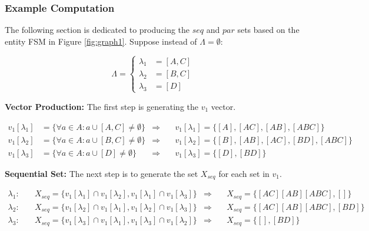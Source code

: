 \subsubsection{Example Computation}
The following section is dedicated to producing the $seq$ and $par$ sets based on the entity FSM in Figure \ref{fig:graph1}. Suppose instead of $\Lambda = \emptyset$:

\begin{equation*}
\Lambda = \begin{cases}
    \lambda_1 &= [A,C] \\
    \lambda_2 &= [B,C] \\ 
    \lambda_3 &= [D]    
\end{cases}
\end{equation*}


\textbf{Vector Production:} The first step is generating the $v_1$ vector.

\begin{align*}
    v_1[\lambda_1] &= \{ \forall a \in A : a \cup [A,C] \neq \emptyset \} & \Rightarrow &
    \quad v_1[\lambda_1] = \{[A],[AC],[AB],[ABC]\} \\
    v_1[\lambda_2] &= \{ \forall a \in A : a \cup [B,C] \neq \emptyset \} & \Rightarrow &
    \quad v_1[\lambda_2] = \{[B],[AB],[AC],[BD],[ABC]\} \\
    v_1[\lambda_3] &= \{ \forall a \in A : a \cup [D] \neq \emptyset \} & \Rightarrow &
    \quad v_1[\lambda_3] = \{[D],[BD]\}
\end{align*}

\textbf{Sequential Set:} The next step is to generate the set $X_{seq}$ for each set in $v_1$.

\begin{align*}
    \lambda_1: \quad & X_{seq} = \{v_1[\lambda_1] \cap v_1[\lambda_2], v_1[\lambda_1] \cap v_1[\lambda_3]\} & \Rightarrow & \quad X_{seq} = \{[AC][AB][ABC],[]\} \\ 
    \lambda_2: \quad & X_{seq} = \{v_1[\lambda_2] \cap v_1[\lambda_1], v_1[\lambda_2] \cap v_1[\lambda_3]\} & \Rightarrow & \quad X_{seq} = \{[AC][AB][ABC],[BD]\} \\ 
    \lambda_3: \quad & X_{seq} = \{v_1[\lambda_3] \cap v_1[\lambda_1], v_1[\lambda_3] \cap v_1[\lambda_2]\} & \Rightarrow & \quad X_{seq} = \{[],[BD]\} \\ 
\end{align*}


